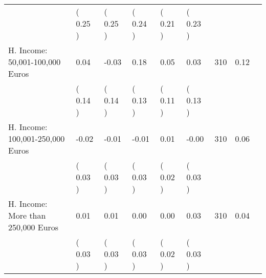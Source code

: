 \begin{tabular}{L{6.2cm} C{1.8cm} C{1.8cm} C{1.8cm} C{1.8cm} C{1.8cm} C{1.8cm} C{0.3cm} C{0.3cm}}
 & (     0.25 ) & (     0.25 ) & (     0.24 ) & (     0.21 ) & (     0.23 )  & \\
H. Income: 50,001-100,000 Euros &      0.04 &     -0.03 &      0.18 &      0.05 &      0.03  & 310 &       0.12 \\ 
 & (     0.14 ) & (     0.14 ) & (     0.13 ) & (     0.11 ) & (     0.13 )  & \\
H. Income: 100,001-250,000 Euros &     -0.02 &     -0.01 &     -0.01 &      0.01 &     -0.00  & 310 &       0.06 \\ 
 & (     0.03 ) & (     0.03 ) & (     0.03 ) & (     0.02 ) & (     0.03 )  & \\
H. Income: More than 250,000 Euros &      0.01 &      0.01 &      0.00 &      0.00 &      0.03  & 310 &       0.04 \\ 
 & (     0.03 ) & (     0.03 ) & (     0.03 ) & (     0.02 ) & (     0.03 )  & \\
\bottomrule
\end{tabular}
